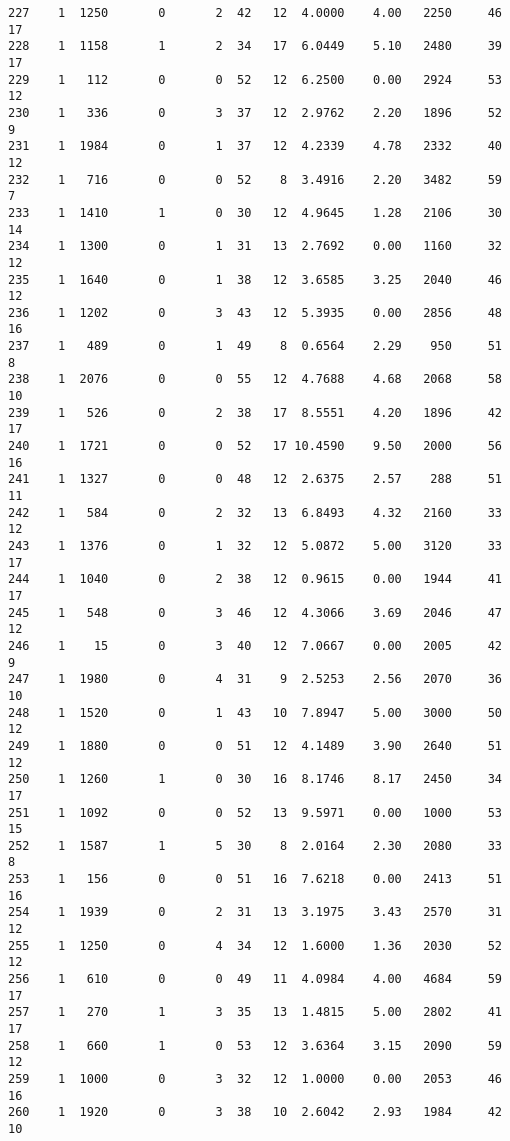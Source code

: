 \documentclass[
  letterpaper,
  DIV=11,
  numbers=noendperiod]{scrreprt}
\begin{document}
\begin{verbatim}
227    1  1250       0       2  42   12  4.0000    4.00   2250     46      17
228    1  1158       1       2  34   17  6.0449    5.10   2480     39      17
229    1   112       0       0  52   12  6.2500    0.00   2924     53      12
230    1   336       0       3  37   12  2.9762    2.20   1896     52       9
231    1  1984       0       1  37   12  4.2339    4.78   2332     40      12
232    1   716       0       0  52    8  3.4916    2.20   3482     59       7
233    1  1410       1       0  30   12  4.9645    1.28   2106     30      14
234    1  1300       0       1  31   13  2.7692    0.00   1160     32      12
235    1  1640       0       1  38   12  3.6585    3.25   2040     46      12
236    1  1202       0       3  43   12  5.3935    0.00   2856     48      16
237    1   489       0       1  49    8  0.6564    2.29    950     51       8
238    1  2076       0       0  55   12  4.7688    4.68   2068     58      10
239    1   526       0       2  38   17  8.5551    4.20   1896     42      17
240    1  1721       0       0  52   17 10.4590    9.50   2000     56      16
241    1  1327       0       0  48   12  2.6375    2.57    288     51      11
242    1   584       0       2  32   13  6.8493    4.32   2160     33      12
243    1  1376       0       1  32   12  5.0872    5.00   3120     33      17
244    1  1040       0       2  38   12  0.9615    0.00   1944     41      17
245    1   548       0       3  46   12  4.3066    3.69   2046     47      12
246    1    15       0       3  40   12  7.0667    0.00   2005     42       9
247    1  1980       0       4  31    9  2.5253    2.56   2070     36      10
248    1  1520       0       1  43   10  7.8947    5.00   3000     50      12
249    1  1880       0       0  51   12  4.1489    3.90   2640     51      12
250    1  1260       1       0  30   16  8.1746    8.17   2450     34      17
251    1  1092       0       0  52   13  9.5971    0.00   1000     53      15
252    1  1587       1       5  30    8  2.0164    2.30   2080     33       8
253    1   156       0       0  51   16  7.6218    0.00   2413     51      16
254    1  1939       0       2  31   13  3.1975    3.43   2570     31      12
255    1  1250       0       4  34   12  1.6000    1.36   2030     52      12
256    1   610       0       0  49   11  4.0984    4.00   4684     59      17
257    1   270       1       3  35   13  1.4815    5.00   2802     41      17
258    1   660       1       0  53   12  3.6364    3.15   2090     59      12
259    1  1000       0       3  32   12  1.0000    0.00   2053     46      16
260    1  1920       0       3  38   10  2.6042    2.93   1984     42      10

\end{verbatim}
\end{document}

